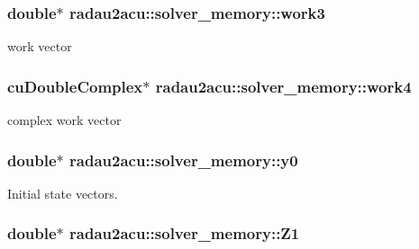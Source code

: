 \subsubsection[{\texorpdfstring{work3}{work3}}]{\setlength{\rightskip}{0pt plus 5cm}double$\ast$ radau2acu\+::solver\+\_\+memory\+::work3}\hypertarget{structradau2acu_1_1solver__memory_addc4decdb12feacf160e9559fc146870}{}\label{structradau2acu_1_1solver__memory_addc4decdb12feacf160e9559fc146870}


work vector 

\subsubsection[{\texorpdfstring{work4}{work4}}]{\setlength{\rightskip}{0pt plus 5cm}cu\+Double\+Complex$\ast$ radau2acu\+::solver\+\_\+memory\+::work4}\hypertarget{structradau2acu_1_1solver__memory_aae4ce4cf4c0399ed3f892c34e63606fe}{}\label{structradau2acu_1_1solver__memory_aae4ce4cf4c0399ed3f892c34e63606fe}


complex work vector 

\subsubsection[{\texorpdfstring{y0}{y0}}]{\setlength{\rightskip}{0pt plus 5cm}double$\ast$ radau2acu\+::solver\+\_\+memory\+::y0}\hypertarget{structradau2acu_1_1solver__memory_a61b9966a8ea1d5526161988837795e7a}{}\label{structradau2acu_1_1solver__memory_a61b9966a8ea1d5526161988837795e7a}


Initial state vectors. 

\subsubsection[{\texorpdfstring{Z1}{Z1}}]{\setlength{\rightskip}{0pt plus 5cm}double$\ast$ radau2acu\+::solver\+\_\+memory\+::\+Z1}\hypertarget{structradau2acu_1_1solver__memory_a3920a2e20d5145ffe2b1ecdca5c7fa22}{}\label{structradau2acu_1_1solver__memory_a3920a2e20d5145ffe2b1ecdca5c7fa22}


